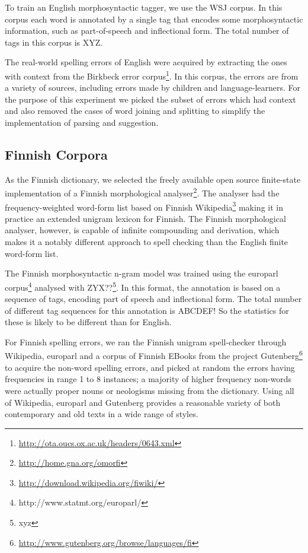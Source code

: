 \documentclass{llncs}
\begin{document}
To train an English morphosyntactic tagger, we use the WSJ corpus. In
this corpus each word is annotated by a single tag that encodes some
morphosyntactic information, such as part-of-speech and inflectional form. The
total number of tags in this corpus is XYZ.

The real-world spelling errors of English were acquired by extracting the ones
with context from the Birkbeck error
corpus\footnote{\url{http://ota.oucs.ox.ac.uk/headers/0643.xml}}. In this
corpus, the errors are from a variety of sources, including errors made by
children and language-learners. For the purpose of this experiment we picked
the subset of errors which had context and also removed the cases of
word joining and splitting to simplify the implementation of parsing and
suggestion.

\subsection{Finnish Corpora}

As the Finnish dictionary, we selected the freely available open source
finite-state implementation of a Finnish morphological
analyser\footnote{\url{http://home.gna.org/omorfi}}. The analyser had the
frequency-weighted word-form list based on Finnish
Wikipedia\footnote{\url{http://download.wikipedia.org/fiwiki/}} making it in
practice an extended unigram lexicon for Finnish. The Finnish morphological
analyser, however, is capable of infinite compounding and derivation, which
makes it a notably different approach to spell checking than the English finite
word-form list. 

The Finnish morphosyntactic n-gram model was trained using the europarl corpus\footnote{http://www.statmt.org/europarl/}
analysed with ZYX??\footnote{xyz}. In this format, the annotation is based on a sequence of
tags, encoding part of speech and inflectional form. The total number of
different tag sequences for this annotation is ABCDEF! So  the
statistics for these is likely to be different than for English.

For Finnish spelling errors, we ran the Finnish unigram spell-checker through
Wikipedia, europarl and a corpus of Finnish EBooks from the project
Gutenberg\footnote{\url{http://www.gutenberg.org/browse/languages/fi}} to
acquire the non-word spelling errors, and picked at random the errors having
frequencies in range 1 to 8 instances; a majority of higher frequency non-words
were actually proper nouns or neologisms missing from the dictionary. Using all of
Wikipedia, europarl and Gutenberg provides a reasonable variety of both
contemporary and old texts in a wide range of styles.
\end{document}
